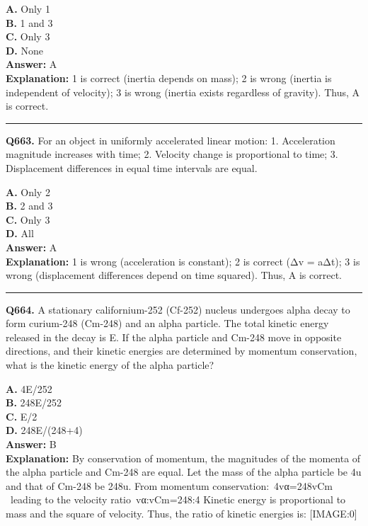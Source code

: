 \documentclass[12pt]{article}
\begin{document}
\textbf{A.} Only 1 \\
\textbf{B.} 1 and 3 \\
\textbf{C.} Only 3 \\
\textbf{D.} None \\

\textbf{Answer:} A \\
\textbf{Explanation:} 1 is correct (inertia depends on mass); 2 is wrong (inertia is independent of velocity); 3 is wrong (inertia exists regardless of gravity). Thus, A is correct.

\hrule
\vspace{1em}


\noindent
\textbf{Q663.} For an object in uniformly accelerated linear motion:
1.
Acceleration magnitude increases with time;
2.
Velocity change is proportional to time;
3.
Displacement differences in equal time intervals are equal.



\textbf{A.} Only 2 \\
\textbf{B.} 2 and 3 \\
\textbf{C.} Only 3 \\
\textbf{D.} All \\

\textbf{Answer:} A \\
\textbf{Explanation:} 1 is wrong (acceleration is constant); 2 is correct (Δv = a\cdot Δt); 3 is wrong (displacement differences depend on time squared). Thus, A is correct.

\hrule
\vspace{1em}


\noindent
\textbf{Q664.} A stationary californium-252 (Cf-252) nucleus undergoes alpha decay to form curium-248 (Cm-248) and an alpha particle. The total kinetic energy released in the decay is E. If the alpha particle and Cm-248 move in opposite directions, and their kinetic energies are determined by momentum conservation, what is the kinetic energy of the alpha particle?



\textbf{A.} 4E/252 \\
\textbf{B.} 248E/252 \\
\textbf{C.} E/2 \\
\textbf{D.} 248E/(248+4) \\

\textbf{Answer:} B \\
\textbf{Explanation:} By conservation of momentum, the magnitudes of the momenta of the alpha particle and Cm-248 are equal. Let the mass of the alpha particle be 4u and that of Cm-248 be 248u. From momentum conservation: 4vα=248vCm  leading to the velocity ratio vα:vCm=248:4 Kinetic energy is proportional to mass and the square of velocity. Thus, the ratio of kinetic energies is:
[IMAGE:0]
\end{document}
